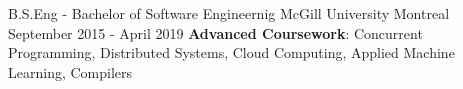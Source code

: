 


\begin{cventries}


\cventry
{B.S.Eng - Bachelor of Software Engineernig} %
{McGill University} %
{Montreal} %
{September 2015 - April 2019} %
{ %
    \textbf{Advanced Coursework}: Concurrent Programming, Distributed Systems, Cloud Computing, Applied Machine Learning, Compilers
}


\end{cventries}
